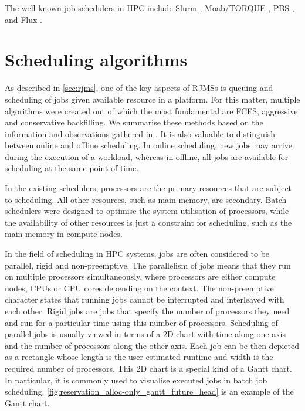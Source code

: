 \documentclass[thesis-en.tex]{subfiles}
\begin{document}
The well-known job schedulers in HPC include Slurm \cite{10.1007/10968987_3,slurm}, Moab/TORQUE \cite{moab-torque}, PBS \cite{pbs-pro,open-pbs}, and Flux \cite{flux}.

\section{Scheduling algorithms} \label{sec:algorithms}
As described in \autoref{sec:rjms}, one of the key aspects of RJMSs is queuing and scheduling of jobs given available resource in a platform. For this matter, multiple algorithms were created out of which the most fundamental are FCFS, aggressive and conservative backfilling. We summarise these methods based on the information and observations gathered in \cite{srinivasan2002characterization,srinivasan2002selective,feitelson2005experimental,8752660}. It is also valuable to distinguish between online and offline scheduling. In online scheduling, new jobs may arrive during the execution of a workload, whereas in offline, all jobs are available for scheduling at the same point of time.

In the existing schedulers, processors are the primary resources that are subject to scheduling. All other resources, such as main memory, are secondary. Batch schedulers were designed to optimise the system utilisation of processors, while the availability of other resources is just a constraint for scheduling, such as the main memory in compute nodes.

In the field of scheduling in HPC systems, jobs are often considered to be parallel, rigid and non-preemptive. The parallelism of jobs means that they run on multiple processors simultaneously, where processors are either compute nodes, CPUs or CPU cores depending on the context. The non-preemptive character states that running jobs cannot be interrupted and interleaved with each other. Rigid jobs are jobs that specify the number of processors they need and run for a particular time using this number of processors. Scheduling of parallel jobs is usually viewed in terms of a 2D chart with time along one axis and the number of processors along the other axis. Each job can be then depicted as a rectangle whose length is the user estimated runtime and width is the required number of processors. This 2D chart is a special kind of a Gantt chart. In particular, it is commonly used to visualise executed jobs in batch job scheduling. \autoref{fig:reservation_alloc-only_gantt_future_head} is an example of the Gantt chart.
\end{document}
